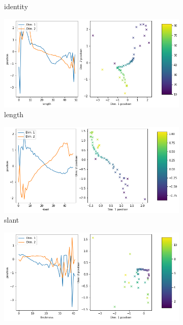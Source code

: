 \documentclass[11pt,a4paper]{article}
\begin{document}
\begin{figure}[H]
\begin{subfigure}{.48\textwidth}
\caption{identity}
\end{subfigure}
\hfill
\begin{subfigure}{.48\textwidth}
\includegraphics[width=\textwidth]{images/latent_space_traversals/vae_mnist_morpho_latent_space_values_length.png}
\caption{length}
\end{subfigure}
\begin{subfigure}{.48\textwidth}
\includegraphics[width=\textwidth]{images/latent_space_traversals/vae_mnist_morpho_latent_space_values_slant.png}
\caption{slant}
\end{subfigure}
\hfill
\begin{subfigure}{.48\textwidth}
\includegraphics[width=\textwidth]{images/latent_space_traversals/vae_mnist_morpho_latent_space_values_thickness.png}

\end{subfigure}
\end{figure}
\end{document}

